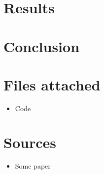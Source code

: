 \documentclass{article}
\begin{document}
\section*{Results}

\section*{Conclusion}

\section*{Files attached}
\begin{itemize}
\item Code
\end{itemize}
\section*{Sources}
\begin{itemize}
\item Some paper
\end{itemize}
\end{document}
